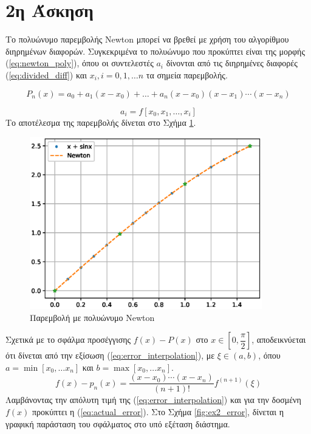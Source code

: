 \documentclass[assignment3.tex]{subfiles}
\begin{document}
\section*{2η Άσκηση}
Το πολυώνυμο παρεμβολής \textlatin{Newton} μπορεί να βρεθεί με χρήση του αλγορίθμου διηρημένων διαφορών. Συγκεκριμένα το πολυώνυμο που προκύπτει είναι της μορφής (\ref{eq:newton_poly}), όπου οι συντελεστές $a_i$ δίνονται από τις διηρημένες διαφορές (\ref{eq:divided_diff}) και $x_i,i=0,1,\dots n$ τα σημεία παρεμβολής. 

\begin{equation}
P_n(x) = a_0 + a_1(x-x_0) + \dots + a_n(x-x_0)(x-x_1)\cdots (x-x_n)
\label{eq:newton_poly}
\end{equation}

\begin{equation}
a_i = f[x_0, x_1, \dots, x_i]
\label{eq:divided_diff}
\end{equation}
Το αποτέλεσμα της παρεμβολής δίνεται στο Σχήμα \ref{fig:ex2}.
\begin{figure}[hp]
	\includegraphics[width=0.9\textwidth]{ex2.eps}
	\centering
	\caption{Παρεμβολή με πολυώνυμο \textlatin{Newton}}
	\label{fig:ex2}
\end{figure}
Σχετικά με το σφάλμα προσέγγισης $f(x)-P(x)$ στο $x\in[0,\dfrac{\pi}{2}]$, αποδεικνύεται ότι δίνεται από την εξίσωση (\ref{eq:error_interpolation}), με $\xi\in (a, b)$, όπου $a=\min[x_0, \dots x_n]$ και $b=\max[x_0, \dots x_n]$.
\begin{equation}
f(x)-p_n(x)=\frac{(x-x_0)\cdots(x-x_n)}{(n+1)!}f^{(n+1)}(\xi)
\label{eq:error_interpolation}
\end{equation}
Λαμβάνοντας την απόλυτη τιμή της (\ref*{eq:error_interpolation}) και για την δοσμένη $f(x)$ προκύπτει η (\ref{eq:actual_error}). Στο Σχήμα \ref{fig:ex2_error}, δίνεται η γραφική παράσταση του σφάλματος στο υπό εξέταση διάστημα.
\end{document}
